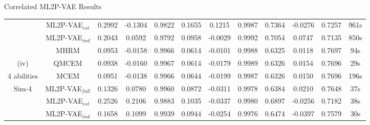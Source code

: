 \documentclass{beamer}
\theoremstyle{definition}
\begin{document}
\begin{frame}{Correlated ML2P-VAE Results}
\begin{tabular}{c|c|ccc|ccc|ccc|c}
& ML2P-VAE$_{est}$ & 0.2992  & -0.1304  & 0.9822  & 0.1655 &  0.1215  & 0.9987  & 0.7364   & -0.0276  & 0.7257 & 961s \\
& ML2P-VAE$_{ind}$ & 0.2043 &   0.0592  & 0.9792  & 0.0958   & -0.0029  & 0.9992  & 0.7054 &  0.0747  & 0.7135 & 850s \\
\hline 
        & MHRM & 0.0953 & -0.0158	&	0.9966 & 0.0614 & -0.0101 &	0.9988 & 0.6325	& 0.0118	& 0.7697 & 94s \\
        (iv)& QMCEM & 0.0938 & -0.0160	&	0.9967 & 0.0614 & -0.0179 &	0.9989 & 0.6326	& 0.0154	& 0.7696 & 29s \\
        4 abilities & MCEM & 0.0951 & -0.0138	&	0.9966 & 0.0644 & -0.0199 &	0.9987 & 0.6326	& 0.0150	& 0.7696 & 196s \\
       Sim-4 & ML2P-VAE$_{full}$ & 0.1326 & 0.0780		&	0.9960 & 0.0872 & -0.0311 &	0.9978 & 0.6384	& 0.0210	& 0.7648 & 37s \\
        & ML2P-VAE$_{est}$ & 0.2526 & 0.2106		&	0.9883 & 0.1035 & -0.0337 &	0.9980 & 0.6897	& -0.0256 	& 0.7182 & 38s \\
        & ML2P-VAE$_{ind}$ & 0.1658 & 0.1099		&	0.9939 & 0.0944 & -0.0254 &	0.9976 & 0.6474	& -0.0397	& 0.7579 & 30s \\

\hline
\end{tabular}
\end{frame}
\end{document}
